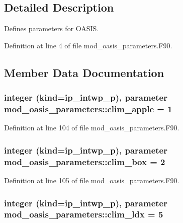 \subsection{Detailed Description}
Defines parameters for O\+A\+S\+I\+S. 

Definition at line 4 of file mod\+\_\+oasis\+\_\+parameters.\+F90.



\subsection{Member Data Documentation}
\hypertarget{classmod__oasis__parameters_a3cfd98fdd1c2fac653b182454c87f4aa}{
\subsubsection[{clim\+\_\+apple}]{\setlength{\rightskip}{0pt plus 5cm}integer (kind=ip\+\_\+intwp\+\_\+p), parameter mod\+\_\+oasis\+\_\+parameters\+::clim\+\_\+apple = 1}}\label{classmod__oasis__parameters_a3cfd98fdd1c2fac653b182454c87f4aa}


Definition at line 104 of file mod\+\_\+oasis\+\_\+parameters.\+F90.

\hypertarget{classmod__oasis__parameters_a9a8b38629274e3a38a37f329ce9d2aa2}{
\subsubsection[{clim\+\_\+box}]{\setlength{\rightskip}{0pt plus 5cm}integer (kind=ip\+\_\+intwp\+\_\+p), parameter mod\+\_\+oasis\+\_\+parameters\+::clim\+\_\+box = 2}}\label{classmod__oasis__parameters_a9a8b38629274e3a38a37f329ce9d2aa2}


Definition at line 105 of file mod\+\_\+oasis\+\_\+parameters.\+F90.

\hypertarget{classmod__oasis__parameters_a3407c11054d24782182c649307808e47}{
\subsubsection[{clim\+\_\+ldx}]{\setlength{\rightskip}{0pt plus 5cm}integer (kind=ip\+\_\+intwp\+\_\+p), parameter mod\+\_\+oasis\+\_\+parameters\+::clim\+\_\+ldx = 5}}\label{classmod__oasis__parameters_a3407c11054d24782182c649307808e47}



